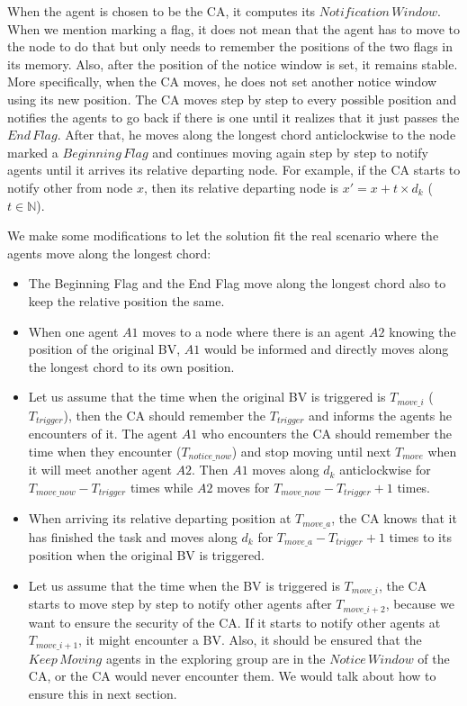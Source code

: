 \documentclass[conference]{IEEEtran}
\begin{document}
When the agent is chosen to be the CA, it computes its $Notification\,Window$. When we mention marking a flag, it does not mean that the agent has to move to the node to do that but only needs to remember the positions of the two flags in its memory. Also, after the position of the notice window is set, it remains stable. More specifically, when the CA moves, he does not set another notice window using its new position. The CA moves step by step to every possible position and notifies the agents to go back if there is one until it realizes that it just passes the $End\,Flag$. After that, he moves along the longest chord anticlockwise to the node marked a $Beginning\,Flag$ and continues moving again step by step to notify agents until it arrives its relative departing node. For example, if the CA starts to notify other from node $x$, then its relative departing node is $x'=x+t\times{d_k}$ ($t\in \mathbb{N}$).

We make some modifications to let the solution fit the real scenario where the agents move along the longest chord: 
\begin{itemize}
\item The Beginning Flag and the End Flag move along the longest chord also to keep the relative position the same. 
\item  When one agent $A1$ moves to a node where there is an agent $A2$ knowing the position of the original BV, $A1$ would be informed and directly moves along the longest chord to its own position. 
\item  Let us assume that the time when the original BV is triggered is $T_{move\_i}$ ($T_{trigger}$), then the CA should remember the $T_{trigger}$ and informs the agents he encounters of it. The agent $A1$ who encounters the CA should remember the time when they encounter ($T_{notice\_now}$) and stop moving until next $T_{move}$ when it will meet another agent $A2$. Then $A1$ moves along $d_k$ anticlockwise for $T_{move\_now}-T_{trigger}$ times while $A2$ moves for $T_{move\_now}-T_{trigger}+1$ times. 
\item When arriving its relative departing position at $T_{move\_a}$, the CA knows that it has finished the task and moves along $d_k$ for $T_{move\_a}- T_{trigger}+1$ times to its position when the original BV is triggered.
\item Let us assume that the time when the BV is triggered is $T_{move\_i}$, the CA starts to move step by step to notify other agents after $T_{move\_{i+2}}$, because we want to ensure the security of the CA. If it starts to notify other agents at $T_{move\_{i+1}}$, it might encounter a BV. Also, it should be ensured that the $Keep\,Moving$ agents in the exploring group are in the $Notice\,Window$ of the CA, or the CA would never encounter them. We would talk about how to ensure this in next section.
\end{itemize} 
\end{document}
